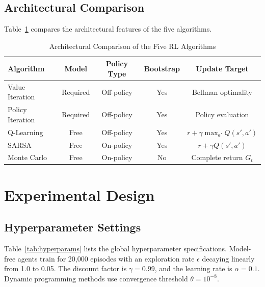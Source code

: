 \documentclass[10pt,conference]{IEEEtran}
\begin{document}
\subsection{Architectural Comparison}
Table~\ref{tab:algo_arch} compares the architectural features of the five algorithms.

\begin{table}[htbp]
\caption{Architectural Comparison of the Five RL Algorithms}
\label{tab:algo_arch}
\centering
\begin{tabular}{lcccc}
\toprule
\textbf{Algorithm} & \textbf{Model} & \textbf{Policy Type} & \textbf{Bootstrap} & \textbf{Update Target} \\
\midrule
Value Iteration    & Required & Off-policy & Yes & Bellman optimality \\
Policy Iteration   & Required & Off-policy & Yes & Policy evaluation \\
Q-Learning         & Free     & Off-policy & Yes & $r + \gamma \max_{a'} Q(s', a')$ \\
SARSA              & Free     & On-policy  & Yes & $r + \gamma Q(s', a')$ \\
Monte Carlo        & Free     & On-policy  & No  & Complete return $G_t$ \\
\bottomrule
\end{tabular}
\end{table}

\section{Experimental Design}

\subsection{Hyperparameter Settings}
Table~\ref{tab:hyperparams} lists the global hyperparameter specifications. Model-free agents train for 20,000 episodes with an exploration rate $\epsilon$ decaying linearly from 1.0 to 0.05. The discount factor is $\gamma = 0.99$, and the learning rate is $\alpha = 0.1$. Dynamic programming methods use convergence threshold $\theta = 10^{-8}$.
\end{document}
